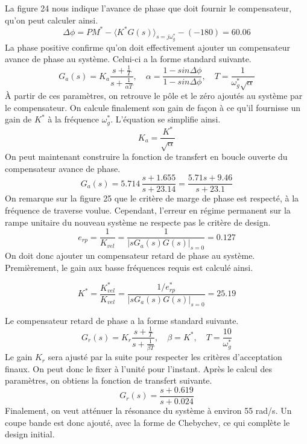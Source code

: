 \documentclass{udes_rapport} %
\begin{document}
La figure 24 nous indique l'avance de phase que doit fournir le compensateur, qu'on peut calculer ainsi.
\[ \Delta \phi = PM^* - \langle K^*G(s)\rangle_{s=j\omega_g^*} -(-180)=60.06\] 
La phase positive confirme qu'on doit effectivement ajouter un compensateur avance de phase au système. Celui-ci a la forme standard suivante.
 \[ G_a(s)=K_a\frac{s+\frac{1}{T}}{s+\frac{1}{\alpha T}}, \quad \alpha = \frac{1-sin\Delta\phi}{1-sin\Delta\phi}, \quad T = \frac{1}{\omega_g^*\sqrt{\alpha}}\]
 À partir de ces paramètres, on retrouve le pôle et le zéro ajoutés au système par le compensateur. On calcule finalement son gain de façon à ce qu'il fournisse un gain de $K^*$ à la fréquence $\omega_g^*$. L'équation se simplifie ainsi.
 \[K_a = \frac{K^*}{\sqrt{\alpha}}\]
On peut maintenant construire la fonction de transfert en boucle ouverte du compensateur avance de phase.
\[ G_a(s) = 5.714\,\frac{s+1.655}{s+23.14} = \frac{5.71s+9.46}{s+23.1} \]
On remarque sur la figure 25 que le critère de marge de phase est respecté, à la fréquence de traverse voulue.
Cependant, l'erreur en régime permanent sur la rampe unitaire du nouveau système ne respecte pas le critère de design.
\[ e_{rp} = \frac{1}{K_{vel}} = \frac{1}{|sG_a(s)G(s)|_{s=0}}=0.127 \]
On doit donc ajouter un compensateur retard de phase au système. Premièrement, le gain aux basse fréquences requis est calculé ainsi.

\[ K^* = \frac{K_{vel}^*}{K_{vel}} = \frac{1/e_{rp}^*}{|sG_a(s)G(s)|_{s=0}} =  25.19\]

Le compensateur retard de phase a la forme standard suivante.
 \[ G_r(s)=K_r\frac{s+\frac{1}{T}}{s+\frac{1}{\beta T}}, \quad \beta = K^*, \quad T = \frac{10}{\omega_g^*}\]
 Le gain $K_r$ sera ajusté par la suite pour respecter les critères d'acceptation finaux. On peut donc le fixer à l'unité pour l'instant. Après le calcul des paramètres, on obtiens la fonction de transfert suivante.
\[ G_r(s) = \frac{s+0.619}{s+0.024} \]
Finalement, on veut atténuer la résonance du système à environ 55 rad/s. Un coupe bande est donc ajouté, avec la forme de Chebychev, ce qui complète le design initial.

\noindent\begin{minipage}{\textwidth}
\begin{minipage}{0.5\textwidth}
\end{minipage} 
\begin{minipage}{0.5\textwidth}
\end{minipage}%

\end{minipage}
\end{document}
